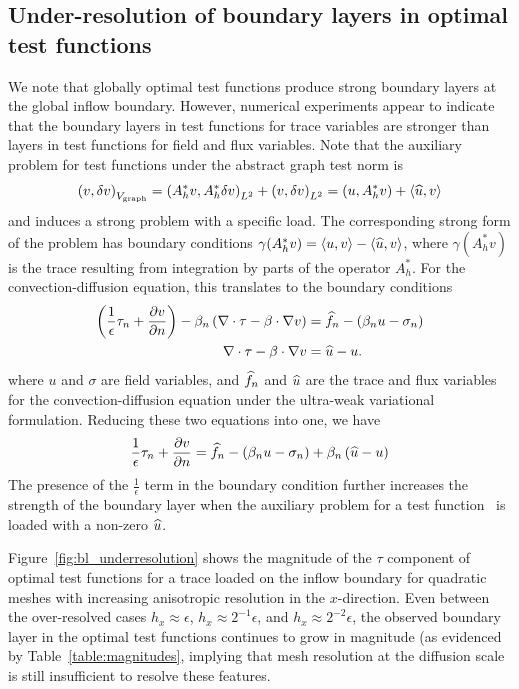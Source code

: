\subsection{Under-resolution of boundary layers in optimal test functions}
\label{ShishkinSection}
We note that globally optimal test functions produce strong boundary layers at the global inflow boundary.  However, numerical experiments appear to indicate that the boundary layers in test functions for trace variables are stronger than layers in test functions for field and flux variables.  Note that the auxiliary problem for test functions under the abstract graph test norm is
\[
\LRp{v,\delta v}_{V_{\rm graph}} = \LRp{A^*_h v, A^*_h \delta v}_{L^2} + \LRp{v,\delta v}_{L^2} = \LRp{u,A^*_h v} + \LRa{\uh, v}
\]
and induces a strong problem with a specific load.  The corresponding strong form of the problem has boundary conditions $\gamma(A^*_h v) = \LRa{u, v} - \LRa{\uh,v}$, where $\gamma(A^*_hv)$ is the trace resulting from integration by parts of the operator $A^*_h$.  For the convection-diffusion equation, this translates to the boundary conditions
\begin{align*}
\LRp{\frac{1}{\epsilon}\tau_n + \pd{v}{n}} - \beta_n\LRp{\div \tau - \beta\cdot \grad v} &= \fnh - (\beta_n u -\sigma_n)\\
\div \tau - \beta\cdot \grad v &= \uh - u.
\end{align*}
where $u$ and $\sigma$ are field variables, and $\fnh$ and $\uh$ are the trace and flux variables for the convection-diffusion equation under the ultra-weak variational formulation.  Reducing these two equations into one, we have
\[
\frac{1}{\epsilon}\tau_n + \pd{v}{n}= \fnh - (\beta_n u -\sigma_n) + \beta_n\LRp{\uh-u}
\]
The presence of the $\frac{1}{\epsilon}$ term in the boundary condition further increases the strength of the boundary layer when the auxiliary problem for a test function~ is loaded with a non-zero $\uh$.  

Figure~\ref{fig:bl_underresolution} shows the magnitude of the $\tau$ component of optimal test functions for a trace loaded on the inflow boundary for quadratic meshes with increasing anisotropic resolution in the $x$-direction.  Even between the over-resolved cases $h_x \approx \epsilon$, $h_x \approx 2^{-1}\epsilon$, and $h_x \approx 2^{-2}\epsilon$, the observed boundary layer in the optimal test functions continues to grow in magnitude (as evidenced by Table~\ref{table:magnitudes}, implying that mesh resolution at the diffusion scale is still insufficient to resolve these features.  

